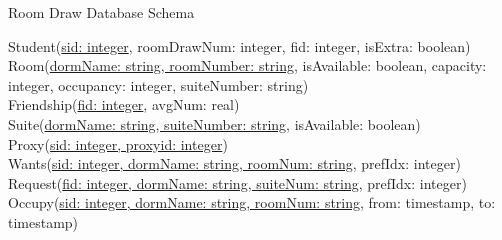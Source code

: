 \documentclass{article}
\begin{document}
\begin{center} \Large Room Draw Database Schema \end{center}

\noindent Student(\underline{sid: integer}, roomDrawNum: integer, fid: integer, isExtra: boolean) \\

\noindent Room(\underline{dormName: string, roomNumber: string}, isAvailable: boolean, capacity: integer, occupancy: integer, suiteNumber: string)\\

\noindent Friendship(\underline{fid: integer}, avgNum: real) \\

\noindent Suite(\underline{dormName: string, suiteNumber: string}, isAvailable: boolean) \\

\noindent Proxy(\underline{sid: integer, proxyid: integer})\\

\noindent Wants(\underline{sid: integer, dormName: string, roomNum: string}, prefIdx: integer) \\

\noindent Request(\underline{fid: integer, dormName: string, suiteNum: string}, prefIdx: integer) \\

\noindent Occupy(\underline{sid: integer, dormName: string, roomNum: string}, from: timestamp, to: timestamp) \\
\end{document}
